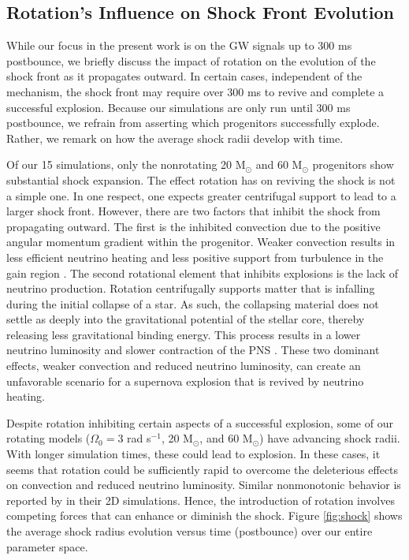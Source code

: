 \documentclass[twocolumn,times]{aastex62}  %
\newcommand{\Msun}{\ensuremath{\mathrm{M}_\odot}\xspace}
\begin{document}
\subsection{Rotation's Influence on Shock Front Evolution}

While our focus in the present work is on the GW signals up to 300 ms postbounce, we briefly discuss the impact of rotation on the evolution of the shock front as it propagates outward.  In certain cases, independent of the mechanism, the shock front may require over 300 ms to revive and complete a successful explosion.  Because our simulations are only run until 300 ms postbounce, we refrain from asserting which progenitors successfully explode.  Rather, we remark on how the average shock radii develop with time.

Of our 15 simulations, only the nonrotating 20 \Msun and 60 \Msun progenitors show substantial shock expansion.  The effect rotation has on reviving the shock is not a simple one. 
In one respect, one expects greater centrifugal support to lead to a larger shock front.  However, there are two factors that inhibit the shock from propagating outward.  The first is the inhibited convection due to the positive angular momentum gradient within the progenitor. Weaker convection results in less efficient neutrino heating \citep{dolence:2013, murphy:2013} and less positive support from turbulence in the gain region \citep{couch:2015a, mabanta:2018}.  The  second rotational element that inhibits explosions is the lack of neutrino production.  Rotation centrifugally supports matter that is infalling during the initial collapse of a star.  As such, the collapsing material does not settle as deeply into the gravitational potential of the stellar core, thereby releasing less gravitational binding energy.  This process results in a lower neutrino luminosity and slower contraction of the PNS \citep{summa:2018}. 
These two dominant effects, weaker convection and reduced neutrino luminosity, can create an unfavorable scenario for a supernova explosion that is revived by neutrino heating.

Despite rotation inhibiting certain aspects of a successful explosion, some of our rotating models ($\Omega_0 = 3$ rad s$^{-1}$, 20 \Msun, and 60 \Msun) have advancing shock radii.  With longer simulation times, these could lead to explosion.  In these cases, it seems that rotation could be sufficiently rapid to overcome the deleterious effects on convection and reduced neutrino luminosity.
Similar nonmonotonic behavior is reported by \citet{summa:2018} in their 2D simulations.
Hence, the introduction of rotation involves competing forces that can enhance or diminish the shock.  Figure \ref{fig:shock} shows the average shock radius evolution versus time (postbounce) over our entire parameter space.
\end{document}

